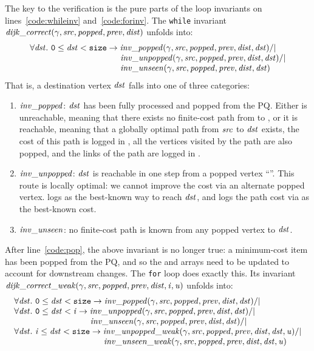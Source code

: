 The key to the verification is the pure parts of the loop
invariants on lines~\ref{code:whileinv} and~\ref{code:forinv}.  The \texttt{while} invariant $\mathit{dijk\_correct}(\gamma, \mathit{src}, \mathit{popped}, \mathit{prev}, \mathit{dist})$ unfolds into:
\[
\begin{array}{l}
\forall \m{dst}.~\texttt{0} \le \m{dst} < \texttt{size} -> \m{inv\_popped}(\gamma, \m{src}, \m{popped}, \m{prev}, \m{dist}, \m{dst}) /| \null \\
\hspace{10.7em}\m{inv\_unpopped}(\gamma, \m{src}, \m{popped}, \m{prev}, \m{dist}, \m{dst}) /| \null \\
\hspace{10.7em}\m{inv\_unseen}(\gamma, \m{src}, \m{popped}, \m{prev}, \m{dist}, \m{dst})
\end{array}
\]
That is, a destination vertex $\mathit{dst}$ falls into one of three
categories:
\begin{enumerate}
\item $\mathit{inv\_popped}$: $\mathit{dst}$ has been fully processed and
popped from the PQ.
Either  is unreachable, meaning that there exists no finite-cost path from 
 to , or it is reachable, meaning that a globally optimal 
path from $\mathit{src}$ to $\mathit{dst}$ exists, the cost of this path is logged in
, all the vertices visited by the path are also popped,
and the links of the path are logged in .
\item $\mathit{inv\_unpopped}$: $\mathit{dst}$ is reachable in
one step from a popped vertex ``''.
This route is locally optimal: we cannot
improve the cost via an alternate popped vertex.
 logs
 as the best-known way to reach $\mathit{dst}$, and 
logs the path cost via  as the best-known cost.
\item $\mathit{inv\_unseen}$: no finite-cost path is known from any popped vertex to
$\mathit{dst}$.
\end{enumerate}
After line~\ref{code:pop}, 
the above invariant is no longer true: a minimum-cost item has been 
popped from the PQ, and so the  and  arrays need to be 
updated to account for downstream changes. The \texttt{for} loop does exactly this.
Its invariant 
$\mathit{dijk\_correct\_weak}(\gamma, \mathit{src}, \mathit{popped}, \mathit{prev}, \mathit{dist}, \mathit{i}, \mathit{u})$ unfolds into:
\[
\begin{array}{l}
\forall \m{dst}.~\texttt{0} \le \m{dst} < \texttt{size} -> \m{inv\_popped}(\gamma, \m{src}, \m{popped}, \m{prev}, \m{dist}, \m{dst}) /| \null \\
\forall \m{dst}.~\texttt{0} \le \m{dst} < \m{i} -> \m{inv\_unpopped}(\gamma, \m{src}, \m{popped}, \m{prev}, \m{dist}, \m{dst}) /| \null \\
\hspace{9em}\m{inv\_unseen}(\gamma, \m{src}, \m{popped}, \m{prev}, \m{dist}, \m{dst}) /| \null \\
\forall \m{dst}.~\m{i} \le \m{dst} < \texttt{size} -> \m{inv\_unpopped\_weak}(\gamma, \m{src}, \m{popped}, \m{prev}, \m{dist}, \m{dst}, \m{u}) /| \null \\
\hspace{10.6em}\m{inv\_unseen\_weak}(\gamma, \m{src}, \m{popped}, \m{prev}, \m{dist}, \m{dst}, \m{u})
\end{array}
\]
